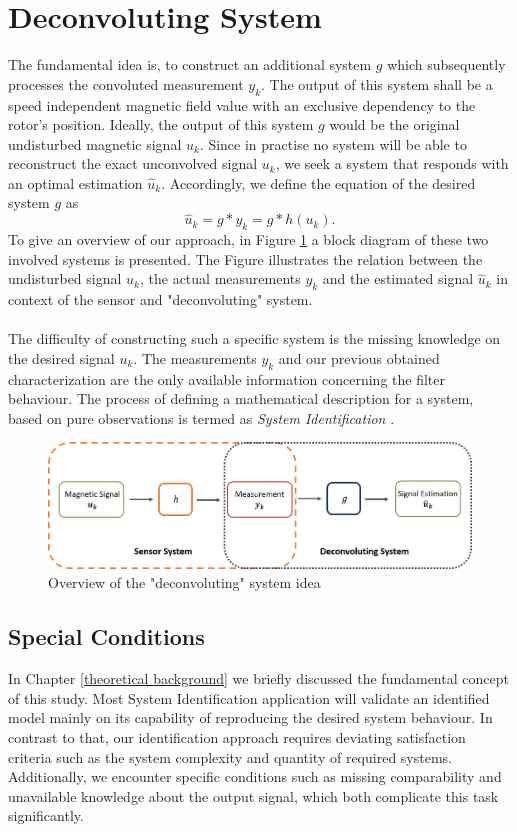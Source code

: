 \documentclass[english]{isasthesis}
\begin{document}
    	\section{Deconvoluting System}
    	The fundamental idea is, to construct an additional system $g$ which subsequently processes the convoluted measurement $y_k$. The output of this system shall be a speed independent magnetic field value with an exclusive dependency to the rotor's position. Ideally, the output of this system $g$ would be the original undisturbed magnetic signal $u_k$. Since in practise no system will be able to reconstruct the exact unconvolved signal $u_k$, we seek a system that responds with an optimal estimation $\hat{u}_k$. Accordingly, we define the equation of the desired system $g$ as
    	\begin{equation}
    	\hat{u}_k = g * y_k = g * h(u_k).
		\end{equation}    	
	To give an overview of our approach, in Figure \ref{fig:deconvolution system} a block diagram of these two involved systems is presented. The Figure illustrates the relation between the undisturbed signal $u_k$, the actual measurements $y_k$ and the estimated signal $\hat{u}_k$ in context of the sensor and "deconvoluting" system. \\\\
		The difficulty of constructing such a specific system is the missing knowledge on the desired signal $u_k$. The measurements $y_k$ and our previous obtained characterization are the only available information concerning the filter behaviour. The process of defining a mathematical description for a system, based on pure observations is termed as \textit{System Identification} \cite{sid}.
		\begin{figure}[t]
    		\begin{center}
    			\includegraphics[width=1\textwidth]{figures/deconvolution_system.jpg}   
  			\end{center}
    		\caption{Overview of the "deconvoluting" system idea}
    		\label{fig:deconvolution system}
    		\end{figure} 
    	\subsection{Special Conditions}
    	In Chapter \ref{theoretical background} we briefly discussed the fundamental concept of this study. Most System Identification application will validate an identified model mainly on its capability of reproducing the desired system behaviour. In contrast to that, our identification approach requires deviating satisfaction criteria such as the system complexity and quantity of required systems. Additionally, we encounter specific conditions such as missing comparability and unavailable knowledge about the output signal, which both complicate this task significantly.
\end{document}
